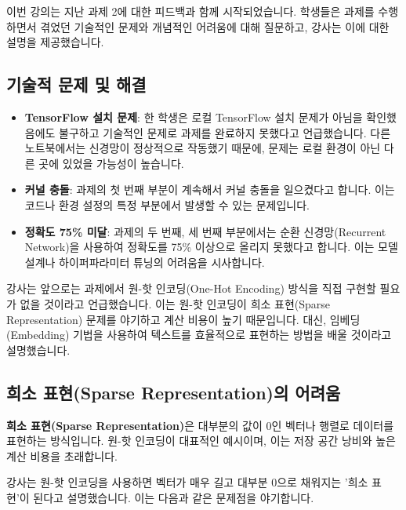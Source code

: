 \documentclass[11pt,a4paper]{article}
\begin{document}
이번 강의는 지난 과제 2에 대한 피드백과 함께 시작되었습니다. 학생들은 과제를 수행하면서 겪었던 기술적인 문제와 개념적인 어려움에 대해 질문하고, 강사는 이에 대한 설명을 제공했습니다.

\subsection{기술적 문제 및 해결}

\begin{itemize}
    \item \textbf{TensorFlow 설치 문제}: 한 학생은 로컬 TensorFlow 설치 문제가 아님을 확인했음에도 불구하고 기술적인 문제로 과제를 완료하지 못했다고 언급했습니다. 다른 노트북에서는 신경망이 정상적으로 작동했기 때문에, 문제는 로컬 환경이 아닌 다른 곳에 있었을 가능성이 높습니다.
    \item \textbf{커널 충돌}: 과제의 첫 번째 부분이 계속해서 커널 충돌을 일으켰다고 합니다. 이는 코드나 환경 설정의 특정 부분에서 발생할 수 있는 문제입니다.
    \item \textbf{정확도 75\% 미달}: 과제의 두 번째, 세 번째 부분에서는 순환 신경망(Recurrent Network)을 사용하여 정확도를 75\% 이상으로 올리지 못했다고 합니다. 이는 모델 설계나 하이퍼파라미터 튜닝의 어려움을 시사합니다.
\end{itemize}

\begin{summarybox}
강사는 앞으로는 과제에서 원-핫 인코딩(One-Hot Encoding) 방식을 직접 구현할 필요가 없을 것이라고 언급했습니다. 이는 원-핫 인코딩이 희소 표현(Sparse Representation) 문제를 야기하고 계산 비용이 높기 때문입니다. 대신, 임베딩(Embedding) 기법을 사용하여 텍스트를 효율적으로 표현하는 방법을 배울 것이라고 설명했습니다.
\end{summarybox}

\subsection{희소 표현(Sparse Representation)의 어려움}

\begin{conceptbox}
\textbf{희소 표현(Sparse Representation)}은 대부분의 값이 0인 벡터나 행렬로 데이터를 표현하는 방식입니다. 원-핫 인코딩이 대표적인 예시이며, 이는 저장 공간 낭비와 높은 계산 비용을 초래합니다.
\end{conceptbox}

강사는 원-핫 인코딩을 사용하면 벡터가 매우 길고 대부분 0으로 채워지는 '희소 표현'이 된다고 설명했습니다. 이는 다음과 같은 문제점을 야기합니다.
\end{document}

